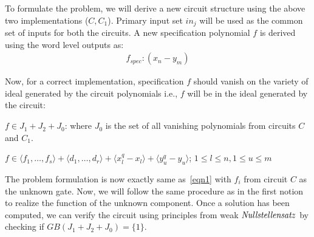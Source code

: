 To formulate the problem, we will derive a new circuit structure using the above two implementations ($C,C_1$). Primary input set $in_j$ will be used as the common set of inputs for both the circuits. A new specification polynomial $f$ is derived using the word level outputs as:
\begin{gather}
f_{spec} : (x_n-y_m)
\end{gather}

Now, for a correct implementation, specification $f$ should vanish on the variety of ideal generated by the circuit polynomials i.e., $f$ will be in the ideal generated by the circuit:

$f \in J_1 + J_2 + J_0$: where $J_0$ is the set of all vanishing polynomials from circuits $C$ and $C_1$.

{\small $f \in \langle f_1,\dots,f_s\rangle + \langle d_1,\dots,d_r\rangle + \langle x_l^q-x_l\rangle + \langle y_u^q-y_u\rangle$; $1\le l \le n,1\le u \le m$}

The problem formulation is now exactly same as~\eqref{eqn1} with $f_i$ from circuit $C$ as the unknown gate. Now, we will follow the same procedure as in the first notion to realize the function of the unknown component. Once a solution has been computed, we can verify the circuit using principles from weak $\it{Nullstellensatz}$ by checking if $GB(J_1+J_2+J_0)=\{1\}$.







